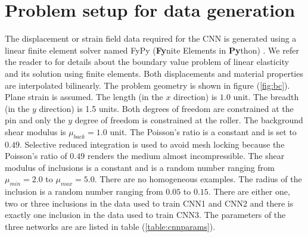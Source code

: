 \documentclass[12pt]{article}
\begin{document}
\section{\label{sect:probsetup}Problem setup for data generation}
The displacement or strain field data required for the CNN is generated using a linear finite element solver named FyPy (\textbf{Fy}nite Elements in \textbf{Py}thon) \cite{misc:fypy}. We refer the reader to \cite{book:hugheslinear,book:fishbelytschko,book:segelmathcont} for details about the boundary value problem of linear elasticity and its solution using finite elements. Both displacements and material properties are interpolated bilinearly. The problem geometry is shown in figure (\ref{fig:bc}). Plane strain is assumed. The length (in the $x$ direction) is $1.0$ unit. The breadth (in the $y$ direction) is 1.5 units. Both degrees of freedom are constrained at the pin and only the $y$ degree of freedom is constrained at the roller. The background shear modulus is $\mu_{back}=1.0$ unit. The Poisson's ratio is a constant and is set to $0.49$. Selective reduced integration is used to avoid mesh locking \cite{book:hugheslinear} because the Poisson's ratio of $0.49$ renders the medium almost incompressible. The shear modulus of inclusions is a constant and is a random number ranging from $\mu_{min}=2.0$ to $\mu_{max}=5.0$. There are no homogeneous examples. The radius of the inclusion is a random number ranging from $0.05$ to $0.15$. There are either one, two or three inclusions in the data used to train CNN1 and CNN2 and there is exactly one inclusion in the data used to train CNN3. The parameters of the three networks are are listed in table (\ref{table:cnnparams}).
\end{document}
